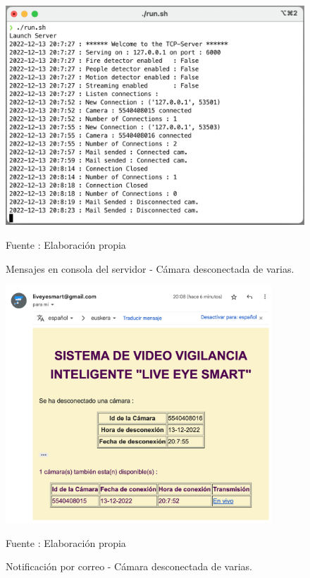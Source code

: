 \begin{figure}[H]
    \begin{center}
        \includegraphics[width=13cm]{img/capitulo_6/cam_disconnected_n_cams.png}
    \end{center}
    \begin{center}
        \caption{Mensajes en consola del servidor - Cámara desconectada de varias.}
        Fuente : Elaboración propia
    \end{center}
\end{figure}

\begin{figure}[H]
    \begin{center}
        \includegraphics[width=10cm]{img/capitulo_6/mail3.png}
    \end{center}
    \begin{center}
        \caption{Notificación por correo - Cámara desconectada de varias.}
        Fuente : Elaboración propia
    \end{center}
\end{figure}

